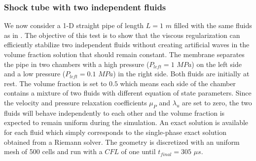 \documentclass[preprint,10pt]{elsarticle}
\begin{document}
\subsubsection{Shock tube with two independent fluids}\label{sec:shock-tube-two-indep-fluids}
%
We now consider a 1-D straight pipe of length $L=1$ $m$ filled with the same fluids as in . The objective of this test is to show that 
the viscous regularization can efficiently stabilize two independent fluids without creating artificial waves in the volume fraction solution that should remain 
constant. The membrane separates the pipe in two chambers with a high pressure ($P_{left} = 1$ $MPa$) on the left side and a low pressure ($P_{left} = 0.1$ 
$MPa$) in the right side. Both fluids are initially at rest. The volume fraction is set to $0.5$ which means each side of the chamber contains a mixture of two 
fluids with different equation of state parameters. Since the velocity and pressure relaxation coefficients $\mu_P$ and $\lambda_u$ are set to zero, the two 
fluids will behave independently to each other and the volume fraction is expected to remain uniform during the simulation. An exact solution is available for 
each fluid which simply corresponds to the single-phase exact solution obtained from a Riemann solver. The geometry is discretized with an uniform mesh of 
500 cells and run with a $CFL$ of one until $t_{final} = 305$ $\mu s$.
%
\end{document}
